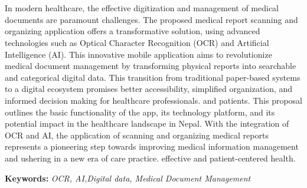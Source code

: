 \chapter*{}

In  modern healthcare, the effective digitization and  management of medical documents are paramount challenges. The proposed medical report scanning and organizing application offers a transformative solution, using advanced technologies such as Optical Character Recognition (OCR) and Artificial Intelligence (AI). This innovative mobile application aims to revolutionize medical document management by transforming physical reports into searchable and categorical digital data. This transition from traditional paper-based systems to a digital ecosystem promises better accessibility, simplified organization, and informed decision making for healthcare professionals. and patients. This proposal outlines the basic functionality of the app, its technology platform, and its potential impact in the healthcare landscape in Nepal. With the integration of OCR and AI, the application of scanning and organizing medical reports represents a pioneering step towards improving medical information management and ushering in a new era of care practice. effective and patient-centered health.

\par

\textbf{Keywords:} \textit{ OCR, AI,Digital data, Medical Document Management}
